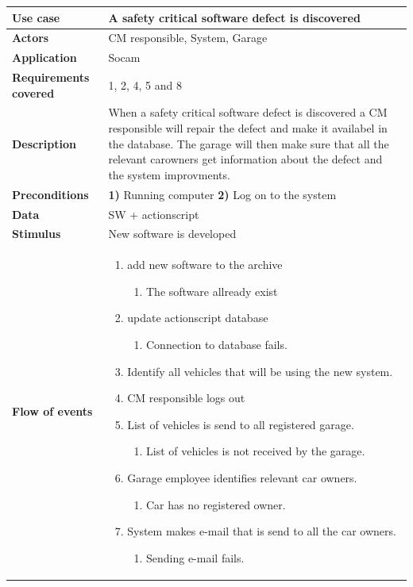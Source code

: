 	\begin{table}[H]
		\begin{tabular}{ p{4cm} | p{10cm} }
			\hline
			\rowcolor{gray}
			{\bf Use case} & {\bf A safety critical software defect is discovered} \\ \hline
			{\bf Actors} & CM responsible, System, Garage \\ \hline
			{\bf Application} & Socam \\ \hline
			{\bf Requirements covered} & 1, 2, 4, 5 and 8\\ \hline
			{\bf Description} & When a safety critical software defect is discovered a CM 
			responsible will repair the defect and make it availabel in the database. 
			The garage will then make sure that all the relevant carowners get information 
			about the defect and the system improvments.\\ \hline
			{\bf Preconditions} & {\bf 1)} Running computer {\bf 2)} Log on to the system \\ \hline
			{\bf Data} & SW + actionscript \\ \hline
			{\bf Stimulus} & New software is developed \\ \hline
			{\bf Flow of events} & 
				\begin{enumerate}[font=\bfseries]
					\item add new software to the archive
						\begin{enumerate}[label*=\arabic*., font=\bfseries]
							\item The software allready exist 
						\end{enumerate}
					\item update actionscript database
						\begin{enumerate}[label*=\arabic*., font=\bfseries]
							\item Connection to database fails. 
						\end{enumerate}
					\item Identify all vehicles that will be using the new system.
					\item CM responsible logs out
					\item List of vehicles is send to all registered garage.
						\begin{enumerate}[label*=\arabic*., font=\bfseries]
							\item  List of vehicles is not received by the garage.
						\end{enumerate}
					\item Garage employee identifies relevant car owners.
						\begin{enumerate}[label*=\arabic*., font=\bfseries]
							\item Car has no registered owner.
						\end{enumerate}
					\item System makes e-mail that is send to all the car owners.
						\begin{enumerate}[label*=\arabic*., font=\bfseries]
							\item Sending e-mail fails.
						\end{enumerate}
				\end{enumerate}
			

\end{tabular}
\end{table}
